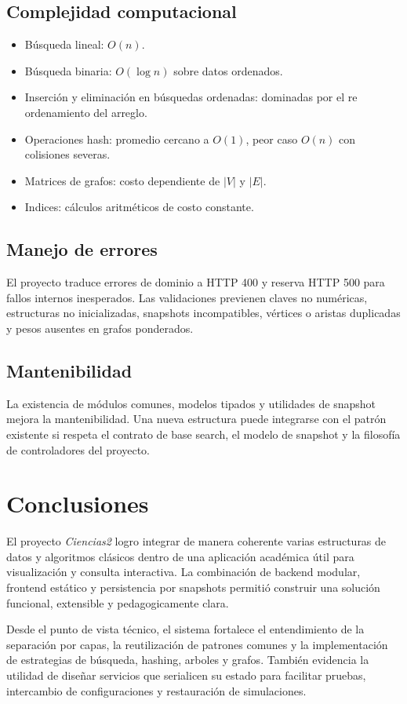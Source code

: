 \documentclass[12pt,onecolumn]{IEEEtran}
\begin{document}
\subsection{Complejidad computacional}
\begin{itemize}
  \item Búsqueda lineal: $O(n)$.
  \item Búsqueda binaria: $O(\log n)$ sobre datos ordenados.
  \item Inserción y eliminación en búsquedas ordenadas: dominadas por el re ordenamiento del arreglo.
  \item Operaciones hash: promedio cercano a $O(1)$, peor caso $O(n)$ con colisiones severas.
  \item Matrices de grafos: costo dependiente de $|V|$ y $|E|$.
  \item Indices: cálculos aritméticos de costo constante.
\end{itemize}

\subsection{Manejo de errores}
El proyecto traduce errores de dominio a HTTP 400 y reserva HTTP 500 para fallos internos inesperados. Las validaciones previenen claves no numéricas, estructuras no inicializadas, snapshots incompatibles, vértices o aristas duplicadas y pesos ausentes en grafos ponderados.

\subsection{Mantenibilidad}
La existencia de módulos comunes, modelos tipados y utilidades de snapshot mejora la mantenibilidad. Una nueva estructura puede integrarse con el patrón existente si respeta el contrato de base search, el modelo de snapshot y la filosofía de controladores del proyecto.

\section{Conclusiones}
El proyecto \textit{Ciencias2} logro integrar de manera coherente varias estructuras de datos y algoritmos clásicos dentro de una aplicación académica útil para visualización y consulta interactiva. La combinación de backend modular, frontend estático y persistencia por snapshots permitió construir una solución funcional, extensible y pedagogicamente clara.

Desde el punto de vista técnico, el sistema fortalece el entendimiento de la separación por capas, la reutilización de patrones comunes y la implementación de estrategias de búsqueda, hashing, arboles y grafos. También evidencia la utilidad de diseñar servicios que serialicen su estado para facilitar pruebas, intercambio de configuraciones y restauración de simulaciones.
\end{document}
